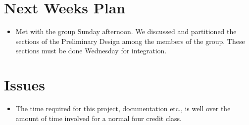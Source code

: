 %
%
%
\section{Next Weeks Plan}
\begin{itemize}
	\item Met with the group Sunday afternoon. We discussed and
partitioned the sections of the Preliminary Design among the members
of the group. These sections must be done Wednesday for integration.
\end{itemize}

%
%
%
\section{Issues}
\begin{itemize}
	\item The time required for this project, documentation etc.,
is well over the amount of time involved for a normal four credit class.
\end{itemize}




